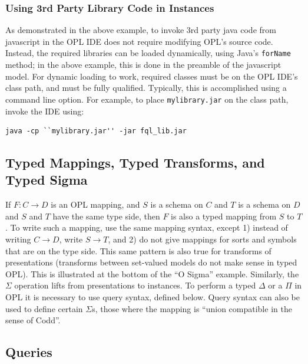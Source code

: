 \documentclass[12pt]{article}
\begin{document}
\subsubsection{Using 3rd Party Library Code in Instances}

As demonstrated in the above example, to invoke 3rd party java code from javascript in the OPL IDE does not require modifying OPL's source code.  Instead, the required libraries can be loaded dynamically, using Java's {\tt forName} method; in the above example, this is done in the preamble of the javascript model.  For dynamic loading to work, required classes must be on the OPL IDE's class path, and must be fully qualified.  Typically, this is accomplished using a command line option.  For example, to place {\tt mylibrary.jar} on the class path, invoke the IDE using:

\begin{verbatim}
java -cp ``mylibrary.jar'' -jar fql_lib.jar
\end{verbatim}

\subsection{Typed Mappings, Typed Transforms, and Typed Sigma}

If $F : C \to D$ is an OPL mapping, and $S$ is a schema on $C$ and $T$ is a schema on $D$ and $S$ and $T$ have the same type side, then $F$ is also a typed mapping from $S$ to $T$.  To write such a mapping, use the same mapping syntax, except 1) instead of writing $C \to D$, write $S \to T$, and 2) do not give mappings for sorts and symbols that are on the type side.  This same pattern is also true for transforms of presentations (transforms between set-valued models do not make sense in typed OPL).  This is illustrated at the bottom of the ``O Sigma'' example.  Similarly, the $\Sigma$ operation lifts from presentations to instances.  To perform a typed $\Delta$ or a $\Pi$ in OPL it is necessary to use query syntax, defined below.  Query syntax can also be used to define certain $\Sigma$s, those where the mapping is ``union compatible in the sense of Codd''.
 
\subsection{Queries}
\end{document}
